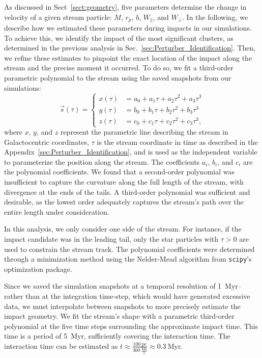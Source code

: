 \documentclass{aa}
\begin{document}
\begin{appendix}
    As discussed in Sect~\ref{sect:geometry},  five parameters determine the change in velocity of a given stream particle: $M$, $r_p$, $b$, $W_\parallel$, and $W_\perp$. In the following, we describe how we estimated these parameters during impacts in our simulations.
    To achieve this, we identify the impact of the most significant clusters, as determined in the previous analysis in Sec.~\ref{sec:Perturber_Identification}. Then, we refine these estimates to pinpoint the exact location of the impact along the stream and the precise moment it occurred. To do so, we fit a third-order parametric polynomial to the stream using the saved snapshots from our simulations:
      \begin{equation}
        \vec{s}(\tau) = 
        \left\{
          \begin{aligned}
            x(\tau) &= a_0 + a_1 \tau + a_2 \tau^2 + a_3 \tau^3 \\ 
            y(\tau) &= b_0 + b_1 \tau + b_2 \tau^2 + b_3 \tau^3 \\
            z(\tau) &= c_0 + c_1 \tau + c_2 \tau^2 + c_3 \tau^3,
          \end{aligned}
        \right.
        \end{equation}  
      where $x$, $y$, and $z$ represent the parametric line describing the stream in Galactocentric coordinates, $\tau$ is the stream coordinate in time as described in the Appendix~\ref{sec:Perturber_Identification}, and is used as the independent variable to parameterize the position along the stream. The coefficients $a_i$, $b_i$, and $c_i$ are the polynomial coefficients. We found that a second-order polynomial was insufficient to capture the curvature along the full length of the stream, with divergence at the ends of the tails. A third-order polynomial was sufficient and desirable, as the lowest order adequately captures the stream's path over the entire length under consideration.

      In this analysis, we only consider one side of the stream. For instance, if the impact candidate was in the leading tail, only the star particles with $\tau > 0$ are used to constrain the stream track. The polynomial coefficients were determined through a minimization method using the Nelder-Mead algorithm from \texttt{scipy}'s optimization package.

      Since we saved the simulation snapshots at a temporal resolution of 1~Myr--rather than at the integration time-step, which would have generated excessive data, we must interpolate between snapshots to more precisely estimate the impact geometry. We fit the stream's shape with a parametric third-order polynomial at the five time steps surrounding the approximate impact time. This time is a period of 5~Myr, sufficiently covering the interaction time. The interaction time can be estimated as $t \approx \frac{100~\text{pc}}{300~\frac{\text{km}}{\text{s}}} \approx 0.3~\text{Myr}$.


\end{appendix}
\end{document}
